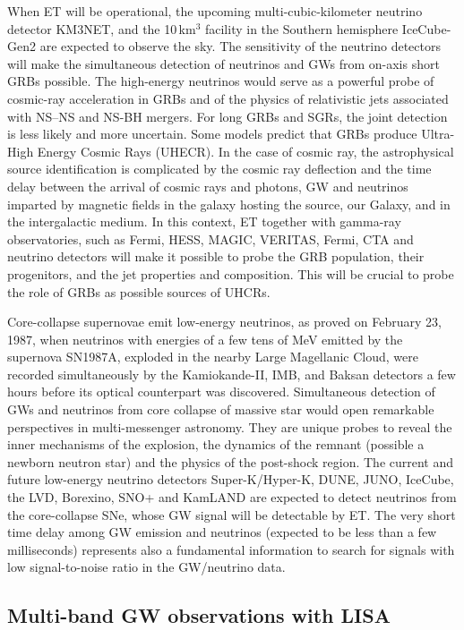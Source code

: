 When ET will be operational, the upcoming multi-cubic-kilometer neutrino detector KM3NET, and the 10\,km$^3$ facility in the Southern hemisphere IceCube-Gen2 are expected to observe the sky. The sensitivity of the neutrino detectors will make the simultaneous detection of neutrinos and GWs from on-axis short GRBs possible. The high-energy neutrinos would serve as a powerful probe of cosmic-ray acceleration in GRBs and of the physics of relativistic jets associated with NS–NS and NS-BH mergers. For long GRBs and SGRs, the joint detection is less likely and more uncertain. Some models predict that GRBs produce Ultra-High Energy Cosmic Rays (UHECR). In the case of cosmic ray, the astrophysical source identification is complicated by the cosmic ray deflection and the time delay between the arrival of cosmic rays and photons, GW and neutrinos imparted by magnetic fields in the galaxy hosting the source, our Galaxy, and in the intergalactic medium. In this context, ET together with gamma-ray observatories, such as Fermi, HESS, MAGIC, VERITAS, Fermi, CTA and neutrino detectors will make it possible to probe the GRB population, their progenitors, and the jet properties and composition. This will be crucial to probe the role of GRBs as possible sources of UHCRs.

Core-collapse supernovae emit low-energy neutrinos, as proved on February 23, 1987, when neutrinos with energies of a few tens of MeV emitted by the supernova SN1987A, exploded in the nearby Large Magellanic Cloud, were recorded simultaneously by the Kamiokande-II, IMB, and Baksan detectors a few hours before its optical counterpart was discovered. Simultaneous detection of GWs and neutrinos from core collapse of massive star would open remarkable perspectives in multi-messenger astronomy. They are unique probes to reveal the inner mechanisms of the explosion, the dynamics of the remnant (possible a newborn neutron star) and the physics of the post-shock region. The current and future low-energy neutrino detectors Super-K/Hyper-K, DUNE, JUNO, IceCube, the LVD, Borexino, SNO+ and KamLAND are expected to detect neutrinos from the core-collapse SNe, whose GW signal will be detectable by ET. The very short time delay among GW emission and neutrinos (expected to be less than a few milliseconds) represents also a fundamental information to search for signals with low signal-to-noise ratio in the GW/neutrino data.

\subsection{Multi-band GW observations with LISA}

